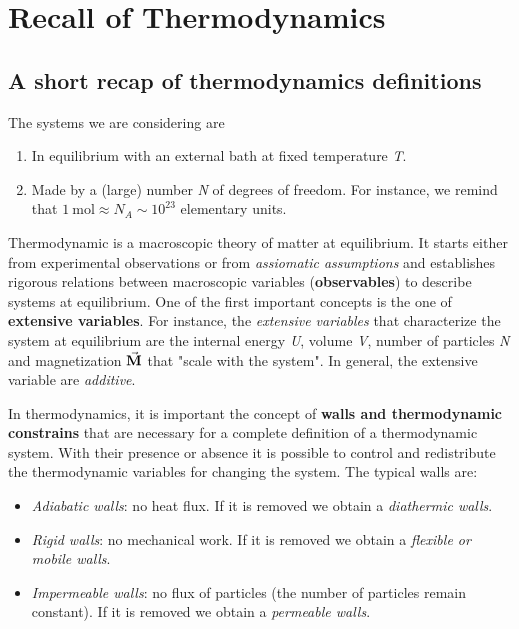 \documentclass[../main/main.tex]{subfiles}
\begin{document}
\chapter{Recall of Thermodynamics}


\section{A short recap of thermodynamics definitions}
\noindent The systems we are considering are

\begin{enumerate}
\item In equilibrium with an external bath at fixed temperature \emph{T}.
\item Made by a (large) number \emph{N} of degrees of freedom. For instance, we remind that \( \SI{1}{\mole} \approx N_A \sim 10^{23}\) elementary units.
\end{enumerate}

\noindent Thermodynamic is a macroscopic theory of matter at equilibrium.
It starts either from experimental observations or from \emph{assiomatic assumptions} and establishes rigorous relations between macroscopic variables (\textbf{observables}) to describe systems at equilibrium.
One of the first important concepts is the one of \textbf{extensive variables}. For instance, the  \emph{extensive variables} that characterize the system at equilibrium are the internal energy \emph{U}, volume \emph{V}, number of particles \emph{N} and magnetization \( \va{M} \) that "scale with the system".
In general, the extensive variable are \emph{additive}.

In thermodynamics, it is important the concept of \textbf{walls and thermodynamic constrains} that are necessary for a complete definition of a thermodynamic system. With their presence or absence it is possible to control and redistribute the thermodynamic variables for changing the system.
The typical walls are:
\begin{itemize}
\item \textit{Adiabatic walls}: no heat flux. If it is removed we obtain a \textit{diathermic walls}.
\item \textit{Rigid walls}: no mechanical work. If it is removed we obtain a \textit{flexible or mobile walls}.
\item \textit{Impermeable walls}: no flux of particles (the number of particles remain constant). If it is removed we obtain a \textit{permeable walls}.
\end{itemize}
\end{document}
